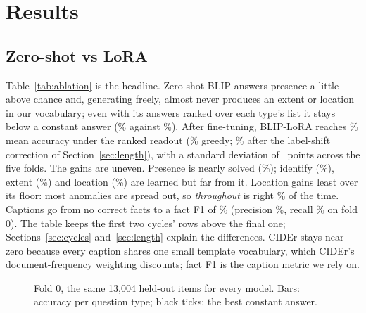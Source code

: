 \documentclass[10pt,twocolumn]{article}
\begin{document}
\section{Results}\label{sec:results}
\subsection{Zero-shot vs LoRA}
\begin{table}[t]\centering\small
\resizebox{\textwidth}{!}{}
\caption{The graded ablation: accuracy (\%) per question type on held-out folds, mean $\pm$ std over 5 field-grouped folds under the ranked readout, greedy generation in brackets, and caption metrics. v1 and v2 are the first and second cycles. \emph{Most common answer} gives the single best answer per question type, picked with hindsight on each fold's test items: the floor any model has to clear.}\label{tab:ablation}
\end{table}

Table~\ref{tab:ablation} is the headline. Zero-shot BLIP answers presence a little above chance and, generating freely, almost never produces an extent or location in our vocabulary; even with its answers ranked over each type's list it stays below a constant answer (\zeroMean\% against \constMean\%). After fine-tuning, BLIP-LoRA reaches \blipMean\% mean accuracy under the ranked readout (\blipGreedy\% greedy; \blipCorrMean\% after the label-shift correction of Section~\ref{sec:length}), with a standard deviation of \blipMeanStd\ points across the five folds. The gains are uneven. Presence is nearly solved (\blipPresence\%); identify (\blipIdentify\%), extent (\blipExtent\%) and location (\blipLocation\%) are learned but far from it. Location gains least over its floor: most anomalies are spread out, so \emph{throughout} is right \constLocation\% of the time. Captions go from no correct facts to a fact F1 of \blipFactF\% (precision \blipFoldPrecision\%, recall \blipFoldRecall\% on fold 0). The table keeps the first two cycles' rows above the final one; Sections~\ref{sec:cycles} and~\ref{sec:length} explain the differences. CIDEr stays near zero because every caption shares one small template vocabulary, which CIDEr's document-frequency weighting discounts; fact F1 is the caption metric we rely on.

\begin{figure}[t]\centering
{}
\caption{Fold 0, the same 13,004 held-out items for every model. Bars: accuracy per question type; black ticks: the best constant answer.}\label{fig:bars}
\end{figure}
\end{document}

